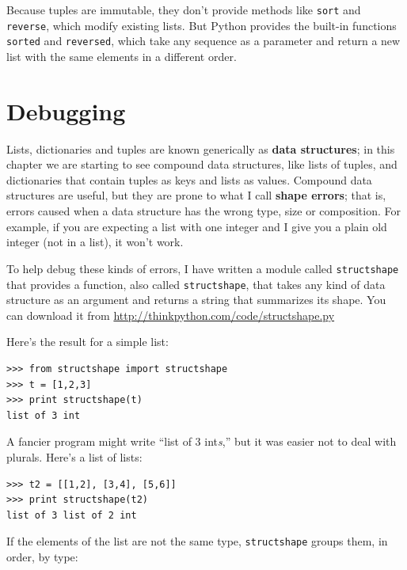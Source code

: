 \documentclass[10pt]{book}
\begin{document}
Because tuples are immutable, they don't provide methods
like {\tt sort} and {\tt reverse}, which modify existing lists.
But Python provides the built-in functions {\tt sorted}
and {\tt reversed}, which take any sequence as a parameter
and return a new list with the same elements in a different
order.


\section{Debugging}

Lists, dictionaries and tuples are known generically as {\bf data
  structures}; in this chapter we are starting to see compound data
structures, like lists of tuples, and dictionaries that contain tuples
as keys and lists as values.  Compound data structures are useful, but
they are prone to what I call {\bf shape errors}; that is, errors
caused when a data structure has the wrong type, size or composition.
For example, if you are expecting a list with one integer and I
give you a plain old integer (not in a list), it won't work.


To help debug these kinds of errors, I have written a module
called {\tt structshape} that provides a function, also called
{\tt structshape}, that takes any kind of data structure as
an argument and returns a string that summarizes its shape.
You can download it from \url{http://thinkpython.com/code/structshape.py}

Here's the result for a simple list:

\begin{verbatim}
>>> from structshape import structshape
>>> t = [1,2,3]
>>> print structshape(t)
list of 3 int
\end{verbatim}
%
A fancier program might write ``list of 3 int{\em s},'' but it
was easier not to deal with plurals.  Here's a list of lists:

\begin{verbatim}
>>> t2 = [[1,2], [3,4], [5,6]]
>>> print structshape(t2)
list of 3 list of 2 int
\end{verbatim}
%
If the elements of the list are not the same type,
{\tt structshape} groups them, in order, by type:
\end{document}
